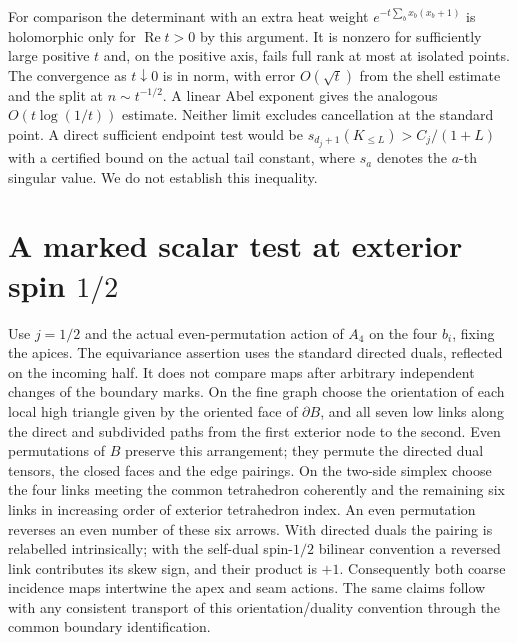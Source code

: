 \documentclass[11pt]{article}
\theoremstyle{remark}
\begin{document}
For comparison the determinant with an extra heat weight \(e^{-t\sum_b x_b(x_b+1)}\) is holomorphic only for \(\operatorname{Re}t>0\) by this argument. It is nonzero for sufficiently large positive \(t\) and, on the positive axis, fails full rank at most at isolated points. The convergence as \(t\downarrow0\) is in norm, with error \(O(\sqrt t)\) from the shell estimate and the split at \(n\sim t^{-1/2}\). A linear Abel exponent gives the analogous \(O(t\log(1/t))\) estimate. Neither limit excludes cancellation at the standard point. A direct sufficient endpoint test would be \(s_{d_j+1}(K_{\le L})>C_j/(1+L)\) with a certified bound on the actual tail constant, where \(s_a\) denotes the \(a\)-th singular value. We do not establish this inequality.

\section{A marked scalar test at exterior spin \texorpdfstring{\(1/2\)}{1/2}}
Use \(j=1/2\) and the actual even-permutation action of \(A_4\) on the four \(b_i\), fixing the apices. The equivariance assertion uses the standard directed duals, reflected on the incoming half. It does not compare maps after arbitrary independent changes of the boundary marks. On the fine graph choose the orientation of each local high triangle given by the oriented face of \(\partial B\), and all seven low links along the direct and subdivided paths from the first exterior node to the second. Even permutations of \(B\) preserve this arrangement; they permute the directed dual tensors, the closed faces and the edge pairings. On the two-side simplex choose the four links meeting the common tetrahedron coherently and the remaining six links in increasing order of exterior tetrahedron index. An even permutation reverses an even number of these six arrows. With directed duals the pairing is relabelled intrinsically; with the self-dual spin-\(1/2\) bilinear convention a reversed link contributes its skew sign, and their product is \(+1\). Consequently both coarse incidence maps intertwine the apex and seam actions. The same claims follow with any consistent transport of this orientation/duality convention through the common boundary identification.
\end{document}
